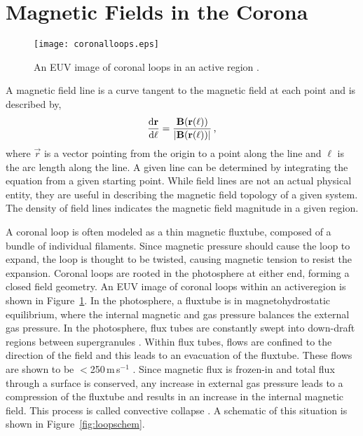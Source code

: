 




\section{Magnetic Fields in the Corona}\label{sect:magcorona}

\begin{figure}[!t]
\centerline{\texttt{[image: coronalloops.eps]}}
\caption[Coronal loops in an active region.]{An EUV image of coronal loops in an active region \citep[from][]{Reale:2010}.}
\label{fig:coronalloops}
\end{figure}

A magnetic field line is a curve tangent to the magnetic field at each point and is described by,
\begin{equation}
\frac{\mathrm{d} \vec{r}}{\mathrm{d} \ell} = \frac{\vec{B}(\vec{r}(\ell))}{|\vec{B}(\vec{r}(\ell))|} \mbox{\,,}
\end{equation}
where $\vec{r}$ is a vector pointing from the origin to a point along the line and $\ell$ is the arc length along the line. A given line can be determined by integrating the equation from a given starting point. While field lines are not an actual physical entity, they are useful in describing the magnetic field topology of a given system. The density of field lines indicates the magnetic field magnitude in a given region.

A coronal loop is often modeled as a thin magnetic \gls{fluxtube}, composed of a bundle of individual filaments. Since magnetic pressure should cause the loop to expand, the loop is thought to be twisted, causing magnetic tension to resist the expansion.
Coronal loops are rooted in the photosphere at either end, forming a closed field geometry. An \gls{EUV} image of coronal loops within an \gls{activeregion} is shown in Figure~\ref{fig:coronalloops}. In the photosphere, a \gls{fluxtube} is in magnetohydrostatic equilibrium, where the internal magnetic and gas pressure balances the external gas pressure. In the photosphere, flux tubes are constantly swept into down-draft regions between supergranules \citep{Simon:1964}. Within flux tubes, flows are confined to the direction of the field and this leads to an evacuation of the \gls{fluxtube}. These flows are shown to be $\lt$250\,m\,s$^{-1}$ \cite{Solanki:1986}. Since magnetic flux is frozen-in and total flux through a surface is conserved, any increase in external gas pressure leads to a compression of the \gls{fluxtube} and results in an increase in the internal magnetic field. This process is called convective collapse \citep{Roberts:2000}. A schematic of this situation is shown in Figure~\ref{fig:loopschem}.

